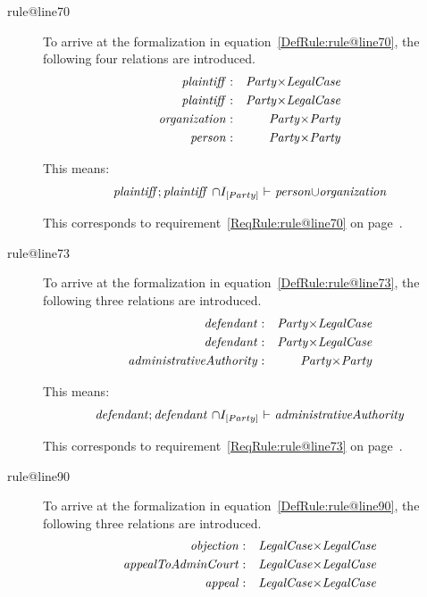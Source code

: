 \documentclass[10pt,a4paper]{report}              %
\theoremstyle{plain}\theorembodyfont{\rmfamily}\newtheorem{definition}{Definition}[section]
\theoremstyle{plain}\theorembodyfont{\rmfamily}\newtheorem{designrule}[definition]{Requirement}
\def\id#1{\mbox{\em #1\/}}
\begin{document}
\begin{description}
\item[rule@line70]
To arrive at the formalization in equation~\ref{DefRule:rule@line70}, the following four relations are introduced.
\begin{eqnarray}
   {\id{plaintiff}}&:&{\id{Party}}{\times}{\id{LegalCase}}\label{DefDecl:plaintiffPartyLegalCase}\\
   {\id{plaintiff}}&:&{\id{Party}}{\times}{\id{LegalCase}}\label{DefDecl:plaintiffPartyLegalCase}\\
   {\id{organization}}&:&{\id{Party}}{\times}{\id{Party}}\label{DefDecl:organizationPartyParty}\\
   {\id{person}}&:&{\id{Party}}{\times}{\id{Party}}\label{DefDecl:personPartyParty}
\end{eqnarray}

This means: 
\begin{equation}
   {\id{plaintiff}};{\id{plaintiff}}~{\cap}I_{[Party]}\ {\vdash}\ {\id{person}}{\cup}{\id{organization}}\label{DefRule:rule@line70}
\end{equation}

This corresponds to requirement~\ref{ReqRule:rule@line70} on page~\pageref{ReqRule:rule@line70}.
\item[rule@line73]
To arrive at the formalization in equation~\ref{DefRule:rule@line73}, the following three relations are introduced.
\begin{eqnarray}
   {\id{defendant}}&:&{\id{Party}}{\times}{\id{LegalCase}}\label{DefDecl:defendantPartyLegalCase}\\
   {\id{defendant}}&:&{\id{Party}}{\times}{\id{LegalCase}}\label{DefDecl:defendantPartyLegalCase}\\
   {\id{administrativeAuthority}}&:&{\id{Party}}{\times}{\id{Party}}\label{DefDecl:administrativeAuthorityPartyParty}
\end{eqnarray}

This means: 
\begin{equation}
   {\id{defendant}};{\id{defendant}}~{\cap}I_{[Party]}\ {\vdash}\ {\id{administrativeAuthority}}\label{DefRule:rule@line73}
\end{equation}

This corresponds to requirement~\ref{ReqRule:rule@line73} on page~\pageref{ReqRule:rule@line73}.
\item[rule@line90]
To arrive at the formalization in equation~\ref{DefRule:rule@line90}, the following three relations are introduced.
\begin{eqnarray}
   {\id{objection}}&:&{\id{LegalCase}}{\times}{\id{LegalCase}}\label{DefDecl:objectionLegalCaseLegalCase}\\
   {\id{appealToAdminCourt}}&:&{\id{LegalCase}}{\times}{\id{LegalCase}}\label{DefDecl:appealToAdminCourtLegalCaseLegalCase}\\
   {\id{appeal}}&:&{\id{LegalCase}}{\times}{\id{LegalCase}}\label{DefDecl:appealLegalCaseLegalCase}
\end{eqnarray}


\end{description}
\end{document}
